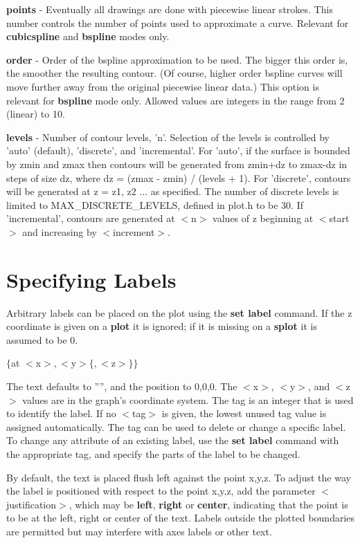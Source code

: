 {\bf points} - Eventually all drawings are done with piecewise linear
strokes.  This number controls the number of points used to
approximate a curve.  Relevant for {\bf cubicspline} and {\bf bspline} modes
only.

{\bf order}  - Order of the bspline approximation to be used. The bigger this
order is, the smoother the resulting contour.  (Of course, higher order
bspline curves will move further away from the original piecewise linear
data.)  This option is relevant for {\bf bspline} mode only. Allowed values are
integers in the range from 2 (linear) to 10.

{\bf levels} - Number of contour levels, 'n'.  Selection of the levels is
controlled by 'auto' (default), 'discrete', and 'incremental'. For 'auto',
if the surface is bounded by zmin and zmax then contours will be
generated from zmin+dz to zmax-dz in steps of size dz, where
dz = (zmax - zmin) / (levels + 1).  For 'discrete', contours will be
generated at z = z1, z2 ... as specified.  The number of discrete levels
is limited to MAX\_DISCRETE\_LEVELS, defined in plot.h to be 30.  If
'incremental', contours are generated at $<$n$>$ values of z beginning at
$<$start$>$ and increasing by $<$increment$>$.

\section{Specifying Labels}
Arbitrary labels can be placed on the plot using the {\bf set label}
command.  If the z coordinate is given on a {\bf plot} it is ignored; if
it is missing on a {\bf splot} it is assumed to be 0.

{$\{$at $<$x$>,<$y$>\{,<$z$>\}\}$}

The text defaults to '''', and the position to 0,0,0.  The $<$x$>$, $<$y$>$, and
$<$z$>$ values are in the graph's coordinate system.  The tag is an
integer that is used to identify the label. If no $<$tag$>$ is given, the
lowest unused tag value is assigned automatically. The tag can be used
to delete or change a specific label. To change any attribute of an
existing label, use the {\bf set label} command with the appropriate tag,
and specify the parts of the label to be changed.

By default, the text is placed flush left against the point x,y,z.
To adjust the way the label is positioned with respect to the point
x,y,z, add the parameter $<$justification$>$, which may be {\bf left}, {\bf right}
or {\bf center}, indicating that the point is to be at the left, right or
center of the text. Labels outside the plotted boundaries are
permitted but may interfere with axes labels or other text.

